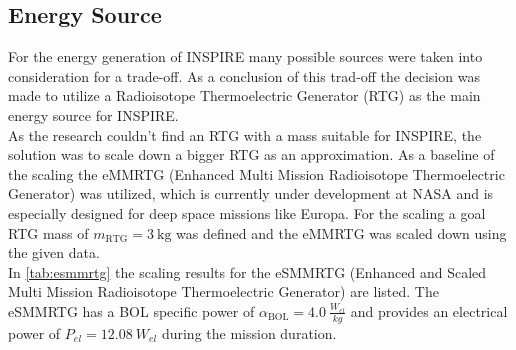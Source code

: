 \subsection{Energy Source}
For the energy generation of INSPIRE many possible sources were taken into consideration for a trade-off. As a conclusion of this trad-off the decision was made to utilize a Radioisotope Thermoelectric Generator (RTG) as the main energy source for INSPIRE.\\
As the research couldn't find an RTG with a mass suitable for INSPIRE, the solution was to scale down a bigger RTG as an approximation. As a baseline of the scaling the eMMRTG (Enhanced Multi Mission Radioisotope Thermoelectric Generator) was utilized, which is currently under development at NASA and is especially designed for deep space missions like Europa. For the scaling a goal RTG mass of $m_\text{RTG}=3 \ \text{kg}$ was defined and the eMMRTG was scaled down using the given data.\\
In \autoref{tab:esmmrtg} the scaling results for the eSMMRTG (Enhanced and Scaled Multi Mission Radioisotope Thermoelectric Generator) are listed. The eSMMRTG has a BOL specific power of $\alpha_\text{BOL}= 4.0 \ \frac{W_{el}}{kg}$ and provides an electrical power of $P_{el} = 12.08 \ W_{el}$ during the mission duration.




%

